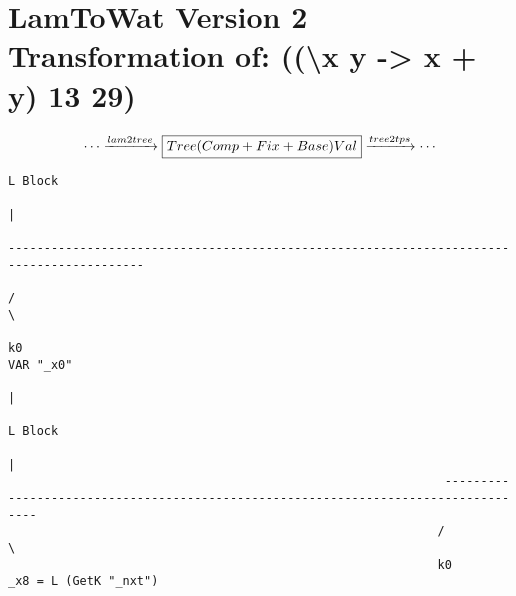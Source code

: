 \section{\label{section:v2printnest}LamToWat Version 2 Transformation of: ((\textbackslash x y -> x + y) 13 29)}

\begin{landscape}
\begin{gather*}
  \cdots \xrightarrow{lam2tree} \boxed{Tree  (Comp + Fix + Base) Val} \xrightarrow{tree2tps} \cdots
\end{gather*}
\begin{lstlisting}[basicstyle=\fontsize{6.5}{7.5}\selectfont\ttfamily]
                                                                                     L Block                                                                                     
                                                                                        |                                                                                        
                                                                                   -----------------------------------------------------------------------------------------     
                                                                                  /                                                                                         \    
                                                                                  k0                                                                                    VAR "_x0"
                                                                                  |                                                                                              
                                                                               L Block                                                                                           
                                                                                  |                                                                                              
                                                             -----------------------------------------------------------------------------------                                 
                                                            /                                                                                   \                                
                                                            k0                                                                        _x8 = L (GetK "_nxt")                      

\end{lstlisting}
\end{landscape}
